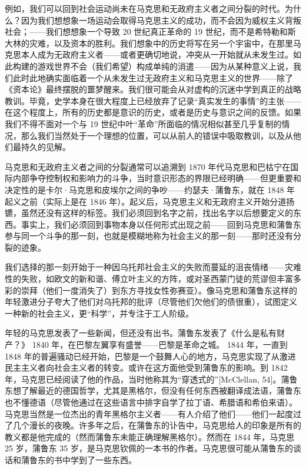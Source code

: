 \documentclass[DIV=12,%
               BCOR=0mm,%
               headinclude=false,%
               footinclude=false,open=any,%
               fontsize=10pt,%
               oneside,%
               paper=210mm:11in]%
               {scrbook}
\begin{document}
例如，我们可以回到社会运动尚未在马克思和无政府主义者之间分裂的时代。为什么？因为我们想想象一场运动会取得马克思主义的成功，而不会因为威权主义背叛社会；——我们想想象一个导致 20 世纪真正革命的 19 世纪，而不是希特勒和斯大林的灾难，以及资本的胜利。我们想象中的历史将写在另一个宇宙中，在那里马克思本人成为无政府主义者——或者更确切地说，冲突从一开始就从未发生过。如此构建的游戏世界不会（我们希望）构成单纯的消遣——因为从某种意义上说，我们此时此地确实面临着一个从未发生过无政府主义和马克思主义的世界——除了《资本论》最终摆脱的噩梦醒来。我们很可能会从对虚构的沉迷中学到真正的战略教训。毕竟，史学本身在很大程度上已经放弃了记录“真实发生的事情”的主张——在这个程度上，所有的历史都是意识的历史，或者是历史与意识之间的反馈。如果我们不得不面对一个与 19 世纪中叶“革命”所面临的情况相似甚至几乎复制的情况，那么我们当然处于一个理想的位置，可以从前人的错误中吸取教训，以及从他们最持久的见解。


马克思和无政府主义者之间的分裂通常可以追溯到 1870 年代马克思和巴枯宁在国际内部争夺控制权和影响力的斗争，当时意识形态的界限已经明确——但更重要和决定性的是卡尔·马克思和皮埃尔之间的争吵——约瑟夫·蒲鲁东，就在 1848 年起义之前（实际上是在 1846 年）。起义后，马克思主义和无政府主义开始分道扬镳，虽然还没有这样的标签。我们必须回到名字之前，找出名字以后想要定义的东西。事实上，我们必须回到事物本身以任何形式出现之前——回到马克思和蒲鲁东参与同一个斗争的那一刻，也就是模糊地称为社会主义的那一刻——那时还没有分裂的迹象。


我们选择的那一刻开始于一种因乌托邦社会主义的失败而蔓延的沮丧情绪——灾难性的失败，如欧文的新和谐、傅立叶主义的方阵，或对圣西蒙门徒的荒谬但丰富多彩的崇拜（他们一度消失了）到东方寻找女性弥赛亚）。像马克思和蒲鲁东这样的年轻激进分子夸大了他们对乌托邦的批评（尽管他们欠他们的债很重），试图定义一种新的社会主义，更“科学”，并专注于工人阶级。


年轻的马克思发表了一些新闻，但还没有出书。蒲鲁东发表了《什么是私有财产？》 1840 年，在巴黎左翼享有盛誉——巴黎是革命之城。 1844 年，一直到 1848 年的普遍骚动已经开始，巴黎是一个鼓舞人心的地方，马克思实现了从激进民主主义者向社会主义者的转变。或许在这方面他受到蒲鲁东的影响。到 1842 年，马克思已经阅读了他的作品，当时他称其为“穿透式的”[McClellan, 54]。蒲鲁东想了解最近的德国哲学，尤其是黑格尔，但没有任何东西被翻译成法语，蒲鲁东也不懂德语（尽管他通过在这些语言中排字自学了拉丁语、希腊语和希伯来语）。马克思当然是一位杰出的青年黑格尔主义者——有人介绍了他们——他们一起度过了几个漫长的夜晚。许多年之后，在蒲鲁东的讣告中，马克思给人的印象是所有的教义都是他完成的（然而蒲鲁东未能正确理解黑格尔）。然而在 1844 年，马克思 25 岁，蒲鲁东 35 岁，是马克思钦佩的一本书的作者。马克思很可能从蒲鲁东的谈话和蒲鲁东的书中学到了一些东西。
\end{document}

